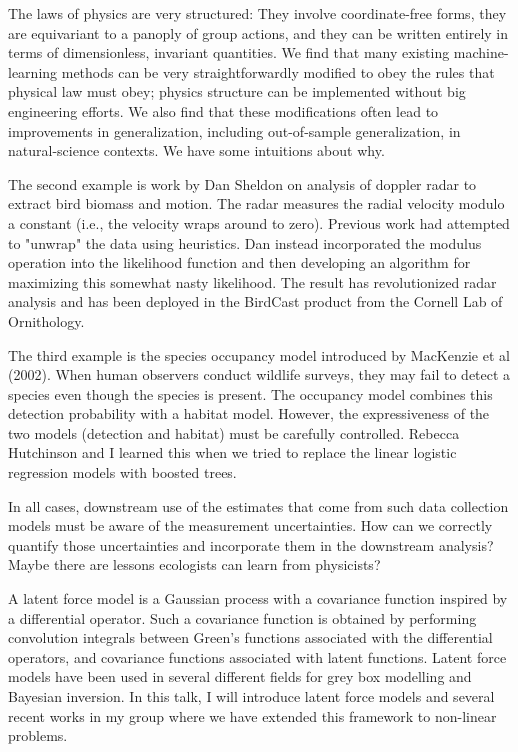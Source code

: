 \license

The laws of physics are very structured: They involve coordinate-free forms, they are equivariant to a panoply of group actions, and they can be written entirely in terms of dimensionless, invariant quantities. We find that many existing machine-learning methods can be very straightforwardly modified to obey the rules that physical law must obey; physics structure can be implemented without big engineering efforts. We also find that these modifications often lead to improvements in generalization, including out-of-sample generalization, in natural-science contexts. We have some intuitions about why.

The second example is work by Dan Sheldon on analysis of doppler radar
to extract bird biomass and motion. The radar measures the radial
velocity modulo a constant (i.e., the velocity wraps around to zero).
Previous work had attempted to "unwrap" the data using heuristics. Dan
instead incorporated the modulus operation into the likelihood function
and then developing an algorithm for maximizing this somewhat nasty
likelihood. The result has revolutionized radar analysis and has been
deployed in the BirdCast product from the Cornell Lab of Ornithology.

The third example is the species occupancy model introduced by MacKenzie
et al (2002). When human observers conduct wildlife surveys, they may
fail to detect a species even though the species is present. The
occupancy model combines this detection probability with a habitat
model. However, the expressiveness of the two models (detection and
habitat) must be carefully controlled. Rebecca Hutchinson and I learned
this when we tried to replace the linear logistic regression models with
boosted trees.

In all cases, downstream use of the estimates that come from such data
collection models must be aware of the measurement uncertainties. How
can we correctly quantify those uncertainties and incorporate them in
the downstream analysis? Maybe there are lessons ecologists can learn
from physicists?

\license

A latent force model is a Gaussian process with a covariance function inspired by a differential operator. Such a covariance function is obtained by performing convolution integrals between Green's functions associated with the differential operators, and covariance functions associated with latent functions. Latent force models have been used in several different fields for grey box modelling and Bayesian inversion. In this talk, I will introduce latent force models and several recent works in my group where we have extended this framework to non-linear problems.

